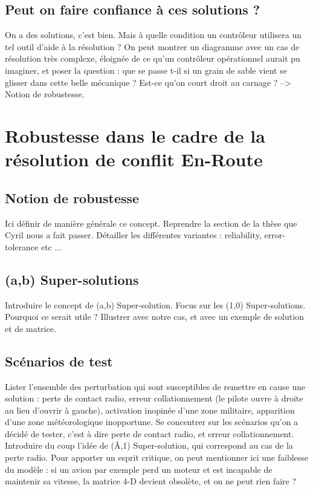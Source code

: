 \documentclass[11pt]{report}
\begin{document}
\section{Peut on faire confiance à ces solutions ?}
On a des solutions, c'est bien. Mais à quelle condition un contrôleur utilisera un tel outil d'aide à la résolution ? On peut montrer un diagramme avec un cas de résolution très complexe, éloignée de ce qu'un contrôleur opérationnel aurait pu imaginer, et poser la question : que se passe t-il si un grain de sable vient se glisser dans cette belle mécanique ? Est-ce qu'on court droit au carnage ? --> Notion de robustesse.

\chapter{Robustesse dans le cadre de la résolution de conflit En-Route}
\section{Notion de robustesse}
Ici définir de manière générale ce concept. Reprendre la section de la thèse que Cyril nous a fait passer. Détailler les différentes variantes : reliability, error-tolerance etc ... 
\section{(a,b) Super-solutions}
Introduire le concept de (a,b) Super-solution. Focus sur les (1,0) Super-solutions. Pourquoi ce serait utile ? Illustrer avec notre cas, et avec un exemple de solution et de matrice.
\section{Scénarios de test}
Lister l'ensemble des perturbation qui sont susceptibles de remettre en cause une solution : perte de contact radio, erreur collationnement (le pilote ouvre à droite au lieu d'ouvrir à gauche), activation inopinée d'une zone militaire, apparition d'une zone météorologique inopportune. Se concentrer sur les scénarios qu'on a décidé de tester, c'est à dire perte de contact radio, et erreur collationnement. Introduire du coup l'idée de (Â,1) Super-solution, qui correspond au cas de la perte radio. Pour apporter un esprit critique, on peut mentionner ici une faiblesse du modèle : si un avion par exemple perd un moteur et est incapable de maintenir sa vitesse, la matrice 4-D devient obsolète, et on ne peut rien faire ?
\end{document}
